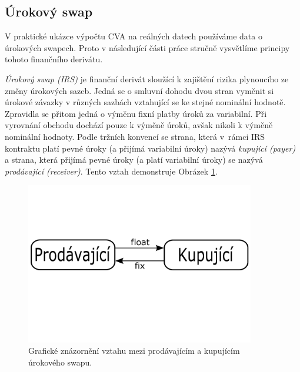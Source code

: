 \documentclass[a4paper,12pt]{report}
\theoremstyle{definition} \newtheorem{definice}[veta]{Definice}
\theoremstyle{remark}
\begin{document}
\subsection{Úrokový swap}\label{swap_kap}
V praktické ukázce výpočtu CVA na reálných datech používáme data o úrokových swapech.
Proto v následující části práce stručně vysvětlíme principy tohoto finančního derivátu.

\textit{Úrokový swap (IRS)} je finanční derivát sloužící k zajištění rizika plynoucího ze změny úrokových sazeb. 
Jedná se o smluvní dohodu dvou stran vyměnit si úrokové závazky v různých sazbách vztahující se ke stejné nominální hodnotě. 
Zpravidla se přitom jedná o výměnu fixní platby úroků za variabilní. 
Při vyrovnání obchodu dochází pouze k výměně úroků, avšak nikoli k výměně nominální hodnoty.
Podle tržních konvencí se strana, která v~rámci IRS kontraktu platí pevné úroky (a přijímá variabilní úroky) nazývá \textit{kupující (payer)} a strana, která přijímá pevné úroky (a platí variabilní úroky) se nazývá \textit{prodávající (receiver)}. 
Tento vztah demonstruje Obrázek \ref{IRS_obr}.

\begin{figure}[!htbp]
  \centering 
	\includegraphics[width=10cm, clip, trim= 0 250 0 170]{IMG/IRS2.pdf}
  \caption{Grafické znázornění vztahu mezi prodávajícím a kupujícím úrokového swapu.}  \label{IRS_obr}
\end{figure}
\end{document}
